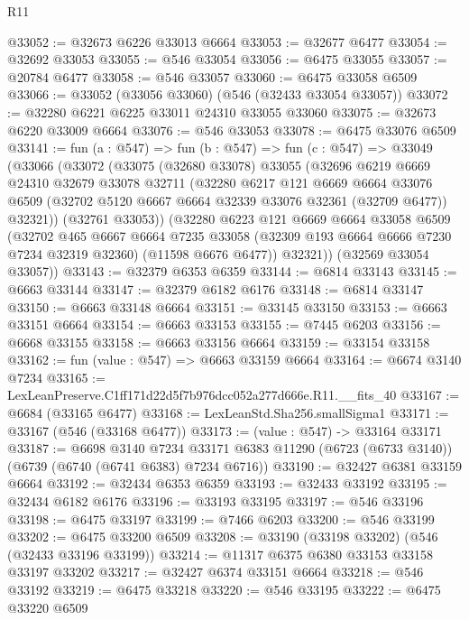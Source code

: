 \begin{lexlean}{R11}
\begin{coremodule}
@33052 := @32673 @6226 @33013 @6664
@33053 := @32677 @6477
@33054 := @32692 @33053
@33055 := @546 @33054
@33056 := @6475 @33055
@33057 := @20784 @6477
@33058 := @546 @33057
@33060 := @6475 @33058 @6509
@33066 := @33052 (@33056 @33060) (@546 (@32433 @33054 @33057))
@33072 := @32280 @6221 @6225 @33011 @24310 @33055 @33060
@33075 := @32673 @6220 @33009 @6664
@33076 := @546 @33053
@33078 := @6475 @33076 @6509
@33141 := fun (a : @547) =>
  fun (b : @547) =>
  fun (c : @547) =>
  @33049
    (@33066
      (@33072
        (@33075
          (@32680 @33078)
          @33055
          (@32696
            @6219
            @6669
            @24310
            @32679
            @33078
            @32711
            (@32280
              @6217
              @121
              @6669
              @6664
              @33076
              @6509
              (@32702 @5120 @6667 @6664 @32339 @33076 @32361 (@32709 @6477))
              @32321))
          (@32761 @33053))
        (@32280
          @6223
          @121
          @6669
          @6664
          @33058
          @6509
          (@32702
            @465
            @6667
            @6664
            @7235
            @33058
            (@32309 @193 @6664 @6666 @7230 @7234 @32319 @32360)
            (@11598 @6676 @6477))
          @32321))
      (@32569 @33054 @33057))
@33143 := @32379 @6353 @6359
@33144 := @6814 @33143
@33145 := @6663 @33144
@33147 := @32379 @6182 @6176
@33148 := @6814 @33147
@33150 := @6663 @33148 @6664
@33151 := @33145 @33150
@33153 := @6663 @33151 @6664
@33154 := @6663 @33153
@33155 := @7445 @6203
@33156 := @6668 @33155
@33158 := @6663 @33156 @6664
@33159 := @33154 @33158
@33162 := fun (value : @547) => @6663 @33159 @6664
@33164 := @6674 @3140 @7234
@33165 := LexLeanPreserve.C1ff171d22d5f7b976dcc052a277d666e.R11.__fits_40
@33167 := @6684 (@33165 @6477)
@33168 := LexLeanStd.Sha256.smallSigma1
@33171 := @33167 (@546 (@33168 @6477))
@33173 := (value : @547) -> @33164 @33171
@33187 := @6698
    @3140
    @7234
    @33171
    @6383
    @11290
    (@6723 (@6733 @3140))
    (@6739 (@6740 (@6741 @6383) @7234 @6716))
@33190 := @32427 @6381 @33159 @6664
@33192 := @32434 @6353 @6359
@33193 := @32433 @33192
@33195 := @32434 @6182 @6176
@33196 := @33193 @33195
@33197 := @546 @33196
@33198 := @6475 @33197
@33199 := @7466 @6203
@33200 := @546 @33199
@33202 := @6475 @33200 @6509
@33208 := @33190 (@33198 @33202) (@546 (@32433 @33196 @33199))
@33214 := @11317 @6375 @6380 @33153 @33158 @33197 @33202
@33217 := @32427 @6374 @33151 @6664
@33218 := @546 @33192
@33219 := @6475 @33218
@33220 := @546 @33195
@33222 := @6475 @33220 @6509

\end{coremodule}
\end{lexlean}
